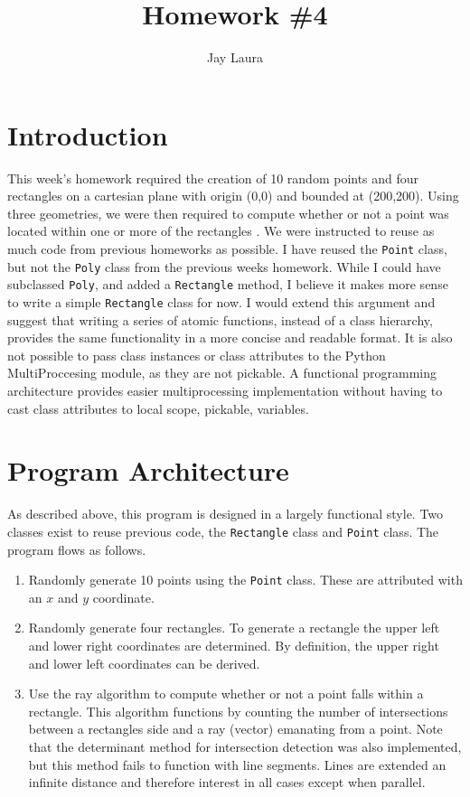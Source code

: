 \documentclass[11pt]{article}
\begin{document}
\title{Homework \#4}
\author{Jay Laura}
\date{}
\maketitle

\section{Introduction}
This week's homework required the creation of 10 random points and four rectangles on a cartesian plane with origin (0,0) and bounded at (200,200).  Using three geometries, we were then required to compute whether or not a point was located within one or more of the rectangles .  We were instructed to reuse as much code from previous homeworks as possible.  I have reused the \texttt{Point} class, but not the \texttt{Poly} class from the previous weeks homework.  While I could have subclassed \texttt{Poly}, and added a \texttt{Rectangle} method, I believe it makes more sense to write a simple \texttt{Rectangle} class for now.  I would extend this argument and suggest that writing a series of atomic functions, instead of a class hierarchy, provides the same functionality in a more concise and readable format.  It is also not possible to pass class instances or class attributes to the Python MultiProccesing module, as they are not pickable.  A functional programming architecture provides easier multiprocessing implementation without having to cast class attributes to local scope, pickable, variables.  
 
 \section{Program Architecture}
As described above, this program is designed in a largely functional style.  Two classes exist to reuse previous code, the \texttt{Rectangle} class and \texttt{Point} class.  The program flows as follows.

\begin{enumerate}
\item Randomly generate 10 points using the \texttt{Point} class.  These are attributed with an $x$ and $y$ coordinate.
\item Randomly generate four rectangles.
	\subitem To generate a rectangle the upper left and lower right coordinates are determined.  By definition, the upper right and lower left coordinates can be derived.
\item Use the ray algorithm to compute whether or not a point falls within a rectangle.  This algorithm functions by counting the number of intersections between a rectangles side and a ray (vector) emanating from a point.
	\subitem Note that the determinant method for intersection detection was also implemented, but this method fails to function with line segments.  Lines are extended an infinite distance and therefore interest in all cases except when parallel.
\end{enumerate}
\end{document}
